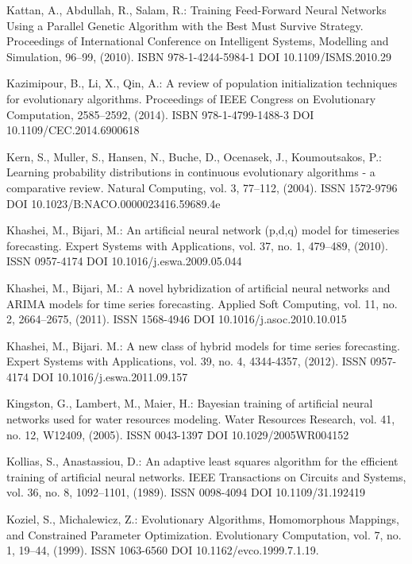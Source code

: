 \begin{thebibliography}{99.}
 Kattan, A., Abdullah, R., Salam, R.: Training Feed-Forward Neural Networks Using a Parallel Genetic Algorithm with the Best Must Survive Strategy. Proceedings of International Conference on Intelligent Systems, Modelling and Simulation, 96--99, (2010). ISBN 978-1-4244-5984-1 DOI 10.1109/ISMS.2010.29

 Kazimipour, B., Li, X., Qin, A.: A review of population initialization techniques for evolutionary algorithms. Proceedings of IEEE Congress on Evolutionary Computation, 2585--2592, (2014). ISBN 978-1-4799-1488-3 DOI 10.1109/CEC.2014.6900618

 Kern, S., Muller, S., Hansen, N., Buche, D., Ocenasek, J., Koumoutsakos, P.: Learning probability distributions in continuous evolutionary algorithms - a comparative review. Natural Computing, vol. 3, 77--112, (2004). ISSN 1572-9796 DOI 10.1023/B:NACO.0000023416.59689.4e

 Khashei, M., Bijari, M.: An artificial neural network (p,d,q) model for timeseries forecasting. Expert Systems with Applications, vol. 37, no. 1, 479--489, (2010). ISSN 0957-4174 DOI 10.1016/j.eswa.2009.05.044

 Khashei, M., Bijari, M.: A novel hybridization of artificial neural networks and ARIMA models for time series forecasting. Applied Soft Computing, vol. 11, no. 2, 2664--2675, (2011). ISSN 1568-4946 DOI 10.1016/j.asoc.2010.10.015

 Khashei, M., Bijari. M.: A new class of hybrid models for time series forecasting. Expert Systems with Applications, vol. 39, no. 4, 4344-4357, (2012). ISSN 0957-4174 DOI 10.1016/j.eswa.2011.09.157

 Kingston, G., Lambert, M., Maier, H.: Bayesian training of artificial neural networks used for water resources modeling. Water Resources Research, vol. 41, no. 12, W12409, (2005). ISSN 0043-1397 DOI 10.1029/2005WR004152

 Kollias, S., Anastassiou, D.: An adaptive least squares algorithm for the efficient training of artificial neural networks. IEEE Transactions on Circuits and Systems, vol. 36, no. 8, 1092--1101, (1989). ISSN 0098-4094 DOI 10.1109/31.192419

 Koziel, S., Michalewicz, Z.: Evolutionary Algorithms, Homomorphous Mappings, and Constrained Parameter Optimization. Evolutionary Computation, vol. 7, no. 1, 19--44, (1999). ISSN 1063-6560 DOI 10.1162/evco.1999.7.1.19.


\end{thebibliography}
